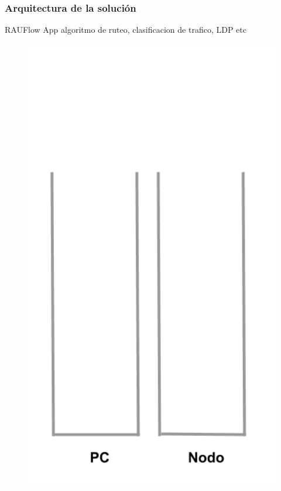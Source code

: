 \documentclass{beamer}
\begin{document}
\begin{frame}
\frametitle{Arquitectura de la soluci\'on} 

\begin{minipage}{0.60\textwidth}
RAUFlow App algoritmo de ruteo, clasificacion de trafico, LDP etc
\end{minipage}
\hfill
\begin{minipage}{0.30\textwidth}
\begin{figure}[H]
\raggedright
\includegraphics[width=1.0\textwidth, right]{imagenes/Stack.png}
\end{figure}
\end{minipage} 


\end{frame}
\end{document}
